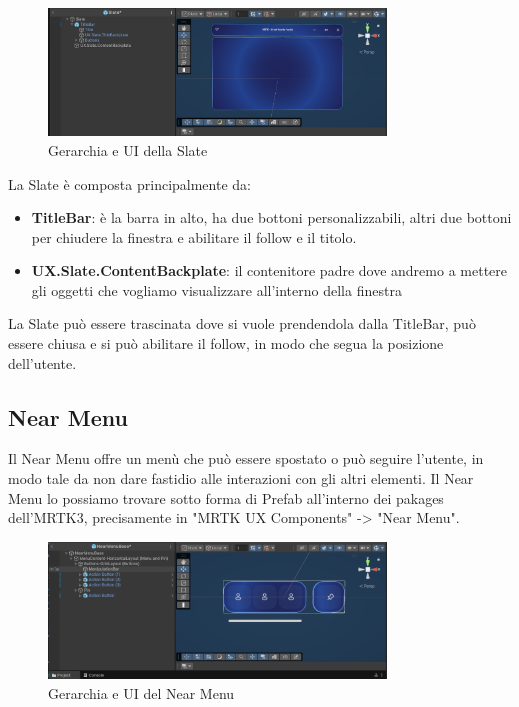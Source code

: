 \begin{figure}[H]
    \centering
    \includegraphics[width=0.8\textwidth,height=\textheight,keepaspectratio]{figures/chapter_1/slate.png}
    \caption{Gerarchia e UI della Slate}
\end{figure}

La Slate è composta principalmente da:
\begin{itemize}
    \item \textbf{TitleBar}: è la barra in alto, ha due bottoni personalizzabili, altri due bottoni per chiudere la finestra e abilitare il follow e il titolo.
    \item \textbf{UX.Slate.ContentBackplate}: il contenitore padre dove andremo a mettere gli oggetti che vogliamo visualizzare all'interno della finestra
\end{itemize}

La Slate può essere trascinata dove si vuole prendendola dalla TitleBar, può essere chiusa e si può abilitare il follow, in modo che segua la posizione dell'utente.
\cite{MRTKslate}

\subsection{Near Menu}
Il Near Menu offre un menù che può essere spostato o può seguire l'utente, in modo tale da non dare fastidio alle interazioni con gli altri elementi. Il Near Menu lo possiamo trovare sotto forma di Prefab all'interno dei pakages dell'MRTK3, precisamente in "MRTK UX Components" -> "Near Menu".

\begin{figure}[H]
    \centering
    \includegraphics[width=0.8\textwidth,height=\textheight,keepaspectratio]{figures/chapter_1/nearMenu.png}
    \caption{Gerarchia e UI del Near Menu}
\end{figure}

